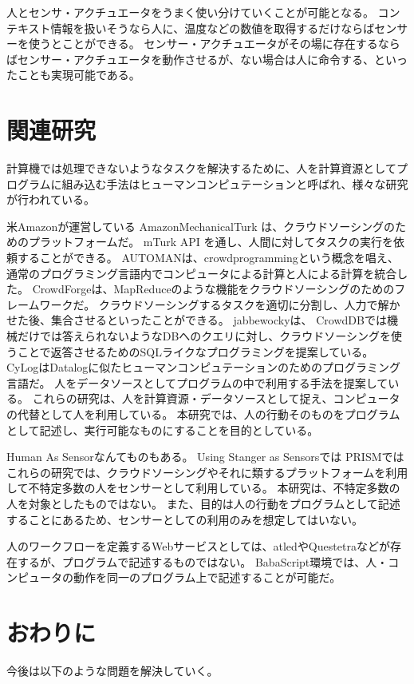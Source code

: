 \documentclass{deimj}
\begin{document}
人とセンサ・アクチュエータをうまく使い分けていくことが可能となる。
コンテキスト情報を扱いそうなら人に、温度などの数値を取得するだけならばセンサーを使うとことができる。
センサー・アクチュエータがその場に存在するならばセンサー・アクチュエータを動作させるが、ない場合は人に命令する、といったことも実現可能である。


\section{関連研究}
計算機では処理できないようなタスクを解決するために、人を計算資源としてプログラムに組み込む手法はヒューマンコンピュテーション\cite{HumanComputation}と呼ばれ、様々な研究が行われている。

米Amazonが運営している AmazonMechanicalTurk\cite{amt} は、クラウドソーシングのためのプラットフォームだ。
mTurk API を通し、人間に対してタスクの実行を依頼することができる。
AUTOMAN\cite{automan}は、crowdprogrammingという概念を唱え、通常のプログラミング言語内でコンピュータによる計算と人による計算を統合した。
CrowdForge\cite{crowdforge}は、MapReduceのような機能をクラウドソーシングのためのフレームワークだ。
クラウドソーシングするタスクを適切に分割し、人力で解かせた後、集合させるといったことができる。
jabbewocky\cite{jabberwocky}は、
CrowdDB\cite{crowddb}では機械だけでは答えられないようなDBへのクエリに対し、クラウドソーシングを使うことで返答させるためのSQLライクなプログラミングを提案している。
CyLog\cite{cylog}はDatalogに似たヒューマンコンピュテーションのためのプログラミング言語だ。
人をデータソースとしてプログラムの中で利用する手法を提案している。
これらの研究は、人を計算資源・データソースとして捉え、コンピュータの代替として人を利用している。
本研究では、人の行動そのものをプログラムとして記述し、実行可能なものにすることを目的としている。

Human As Sensorなんてものもある。
Using Stanger as Sensorsでは
PRISMでは
これらの研究では、クラウドソーシングやそれに類するプラットフォームを利用して不特定多数の人をセンサーとして利用している。
本研究は、不特定多数の人を対象としたものではない。
また、目的は人の行動をプログラムとして記述することにあるため、センサーとしての利用のみを想定してはいない。

人のワークフローを定義するWebサービスとしては、atled\cite{atled}やQuestetra\cite{questetra}などが存在するが、プログラムで記述するものではない。
BabaScript環境では、人・コンピュータの動作を同一のプログラム上で記述することが可能だ。

\section{おわりに}
今後は以下のような問題を解決していく。
\end{document}
